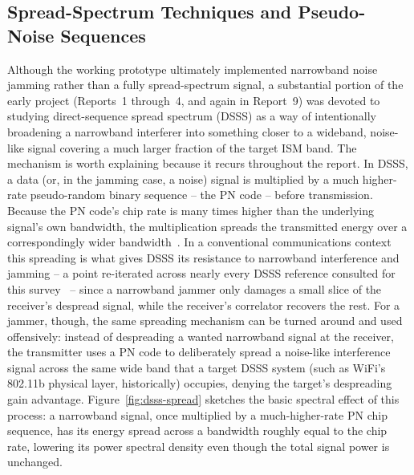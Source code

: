 \documentclass[12pt,a4paper]{report}
\begin{document}
	\subsection{Spread-Spectrum Techniques and Pseudo-Noise Sequences}
	
	Although the working prototype ultimately implemented narrowband noise jamming rather than a fully spread-spectrum signal, a substantial portion of the early project (Reports~1 through~4, and again in Report~9) was devoted to studying direct-sequence spread spectrum (DSSS) as a way of intentionally broadening a narrowband interferer into something closer to a wideband, noise-like signal covering a much larger fraction of the target ISM band. The mechanism is worth explaining because it recurs throughout the report. In DSSS, a data (or, in the jamming case, a noise) signal is multiplied by a much higher-rate pseudo-random binary sequence -- the PN code -- before transmission. Because the PN code's chip rate is many times higher than the underlying signal's own bandwidth, the multiplication spreads the transmitted energy over a correspondingly wider bandwidth~\cite{ref7,ref8,ref9}. In a conventional communications context this spreading is what gives DSSS its resistance to narrowband interference and jamming -- a point re-iterated across nearly every DSSS reference consulted for this survey~\cite{ref7,ref8,ref9,ref10} -- since a narrowband jammer only damages a small slice of the receiver's despread signal, while the receiver's correlator recovers the rest. For a jammer, though, the same spreading mechanism can be turned around and used offensively: instead of despreading a wanted narrowband signal at the receiver, the transmitter uses a PN code to deliberately spread a noise-like interference signal across the same wide band that a target DSSS system (such as WiFi's 802.11b physical layer, historically) occupies, denying the target's despreading gain advantage.
	Figure~\ref{fig:dsss-spread} sketches the basic spectral effect of this process: a narrowband signal, once multiplied by a much-higher-rate PN chip sequence, has its energy spread across a bandwidth roughly equal to the chip rate, lowering its power spectral density even though the total signal power is unchanged.
	
\end{document}
